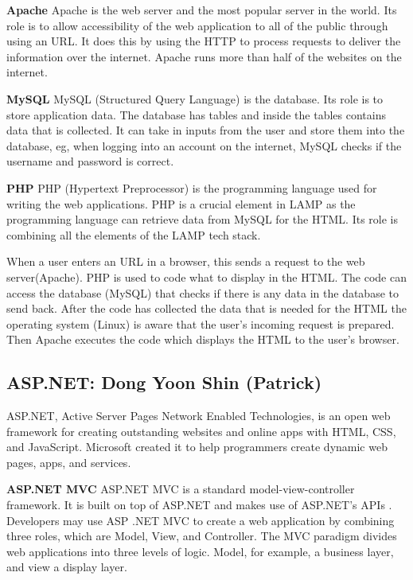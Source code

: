 \documentclass[a4paper, 11pt]{report}
\begin{document}
\textbf{Apache}
Apache is the web server and the most popular server in the world. Its role is to allow accessibility of the web application to all of the public through using an URL. It does this by using the HTTP to process requests to deliver the information over the internet. Apache runs more than half of the websites on the internet. 

\textbf{MySQL}
MySQL (Structured Query Language) is the database. Its role is to store application data. The database has tables and inside the tables contains data that is collected. It can take in inputs from the user and store them into the database, eg, when logging into an account on the internet, MySQL checks if the username and password is correct. 

\textbf{PHP}
PHP (Hypertext Preprocessor) is the programming language used for writing the web applications. PHP is a crucial element in LAMP as the programming language can retrieve data from MySQL for the HTML. Its role is combining all the elements of the LAMP tech stack. 

When a user enters an URL in a browser, this sends a request to the web server(Apache). PHP is used to code what to display in the HTML. The code can access the database (MySQL) that checks if there is any data in the database to send back. After the code has collected the data that is needed for the HTML the operating system (Linux) is aware that the user’s incoming request is prepared. Then Apache executes the code which displays the HTML to the user’s browser. 


\subsection{ASP.NET: Dong Yoon Shin (Patrick)}

  ASP.NET, Active Server Pages Network Enabled Technologies, is an open web framework for creating outstanding websites and online apps with HTML, CSS, and JavaScript\cite{techst}. Microsoft created it to help programmers create dynamic web pages, apps, and services.

\textbf{ASP.NET MVC}
  ASP.NET MVC is a standard model-view-controller framework. It is built on top of ASP.NET and makes use of ASP.NET's APIs \cite{techst}. Developers may use ASP .NET MVC to create a web application by combining three roles, which are Model, View, and Controller. The MVC paradigm divides web applications into three levels of logic. Model, for example, a business layer, and view a display layer. 
\end{document}
